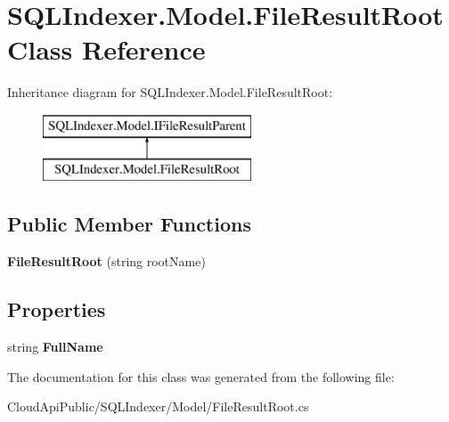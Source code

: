 \hypertarget{class_s_q_l_indexer_1_1_model_1_1_file_result_root}{\section{S\-Q\-L\-Indexer.\-Model.\-File\-Result\-Root Class Reference}
\label{class_s_q_l_indexer_1_1_model_1_1_file_result_root}
}
Inheritance diagram for S\-Q\-L\-Indexer.\-Model.\-File\-Result\-Root\-:\begin{figure}[H]
\begin{center}
\leavevmode
\includegraphics[height=2.000000cm]{class_s_q_l_indexer_1_1_model_1_1_file_result_root}
\end{center}
\end{figure}
\subsection*{Public Member Functions}
\begin{DoxyCompactItemize}
\item 
\hypertarget{class_s_q_l_indexer_1_1_model_1_1_file_result_root_a26e00d21f2e37ede837f02371f052739}{{\bfseries File\-Result\-Root} (string root\-Name)}\label{class_s_q_l_indexer_1_1_model_1_1_file_result_root_a26e00d21f2e37ede837f02371f052739}

\end{DoxyCompactItemize}
\subsection*{Properties}
\begin{DoxyCompactItemize}
\item 
\hypertarget{class_s_q_l_indexer_1_1_model_1_1_file_result_root_afd338f93378efac212408f6c780e6036}{string {\bfseries Full\-Name}}\label{class_s_q_l_indexer_1_1_model_1_1_file_result_root_afd338f93378efac212408f6c780e6036}

\end{DoxyCompactItemize}


The documentation for this class was generated from the following file\-:\begin{DoxyCompactItemize}
\item 
Cloud\-Api\-Public/\-S\-Q\-L\-Indexer/\-Model/File\-Result\-Root.\-cs\end{DoxyCompactItemize}
